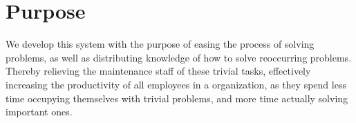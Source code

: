\section{Purpose}
We develop this system with the purpose of easing the process of solving problems, as well as distributing knowledge of how to solve reoccurring problems. Thereby relieving the maintenance staff of these trivial tasks, effectively increasing the productivity of all employees in a organization, as they spend less time occupying themselves with trivial problems, and more time actually solving important ones.

